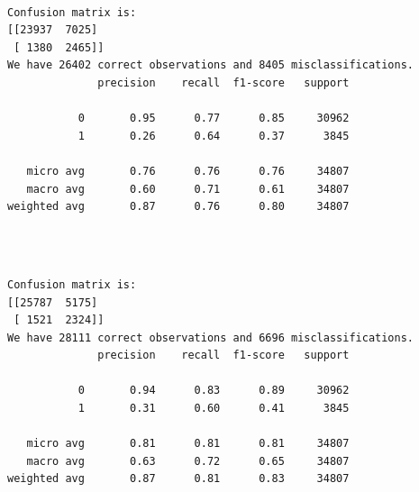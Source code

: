 \documentclass[8pt,onecolumn,aps,pra]{revtex4-1}
\begin{document}
    \begin{center}
    \end{center}
    { \hspace*{\fill} \\}
    
    \begin{Verbatim}[commandchars=\\\{\}]
Confusion matrix is:
[[23937  7025]
 [ 1380  2465]]
We have 26402 correct observations and 8405 misclassifications.
              precision    recall  f1-score   support

           0       0.95      0.77      0.85     30962
           1       0.26      0.64      0.37      3845

   micro avg       0.76      0.76      0.76     34807
   macro avg       0.60      0.71      0.61     34807
weighted avg       0.87      0.76      0.80     34807


    \end{Verbatim}

    \begin{center}
    \end{center}
    { \hspace*{\fill} \\}
    
    \begin{Verbatim}[commandchars=\\\{\}]
Confusion matrix is:
[[25787  5175]
 [ 1521  2324]]
We have 28111 correct observations and 6696 misclassifications.
              precision    recall  f1-score   support

           0       0.94      0.83      0.89     30962
           1       0.31      0.60      0.41      3845

   micro avg       0.81      0.81      0.81     34807
   macro avg       0.63      0.72      0.65     34807
weighted avg       0.87      0.81      0.83     34807


    \end{Verbatim}

    \begin{center}
    \end{center}
    { \hspace*{\fill} \\}
    
\end{document}

